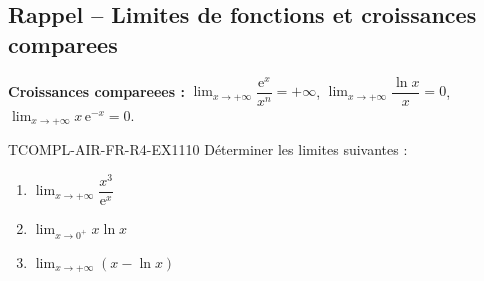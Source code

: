 

\subsection*{Rappel -- Limites de fonctions et croissances comparees}

\textbf{Croissances compareees :} $\lim_{x \to +\infty} \dfrac{\mathrm{e}^x}{x^n} = +\infty$, $\lim_{x \to +\infty} \dfrac{\ln x}{x} = 0$, $\lim_{x \to +\infty} x\,\mathrm{e}^{-x} = 0$.

\begin{exercice}{TCOMPL-AIR-FR-R4-EX1}{1}{10}
Déterminer les limites suivantes :
\begin{enumerate}
  \item $\lim_{x \to +\infty} \dfrac{x^3}{\mathrm{e}^x}$
  \item $\lim_{x \to 0^+} x \ln x$
  \item $\lim_{x \to +\infty} \left(x - \ln x\right)$
\end{enumerate}
\end{exercice}

